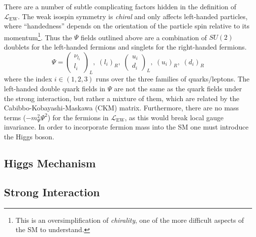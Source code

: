 There are a number of subtle complicating factors hidden in the definition of $\mathcal{L}_{\mathrm{EW}}$.
The weak isospin symmetry is \textit{chiral} and only affects left-handed particles, where ``handedness'' depends on the orientation of the particle spin relative to its momentum\footnote{This is an oversimplification of \textit{chirality}, one of the more difficult aspects of the SM to understand.}.
Thus the $\Psi$ fields outlined above are a combination of $SU(2)$ doublets for the left-handed fermions and singlets for the right-handed fermions.
\begin{equation}
    \Psi = \begin{pmatrix}
           \nu_{l_i} \\
           l_i
         \end{pmatrix}_L,\;
         (l_i)_R,\;
    \begin{pmatrix}
           u_i \\
           d_i
        \end{pmatrix}_L,\;
        (u_i)_R,\; (d_i)_R
\end{equation}
where the index $i \in (1,2,3)$ runs over the three families of quarks/leptons.
The left-handed double quark fields in $\Psi$ are not the same as the quark fields under the strong interaction, but rather a mixture of them, which are related by the Cabibbo-Kobayashi-Maskawa (CKM) matrix. %
Furthermore, there are no mass terms ($-m_\Psi^2 \Psi^2$) for the fermions in $\mathcal{L}_{\mathrm{EW}}$, as this would break local gauge invariance.
In order to incorporate fermion mass into the SM one must introduce the Higgs boson.

\subsection{Higgs Mechanism}

\subsection{Strong Interaction}


